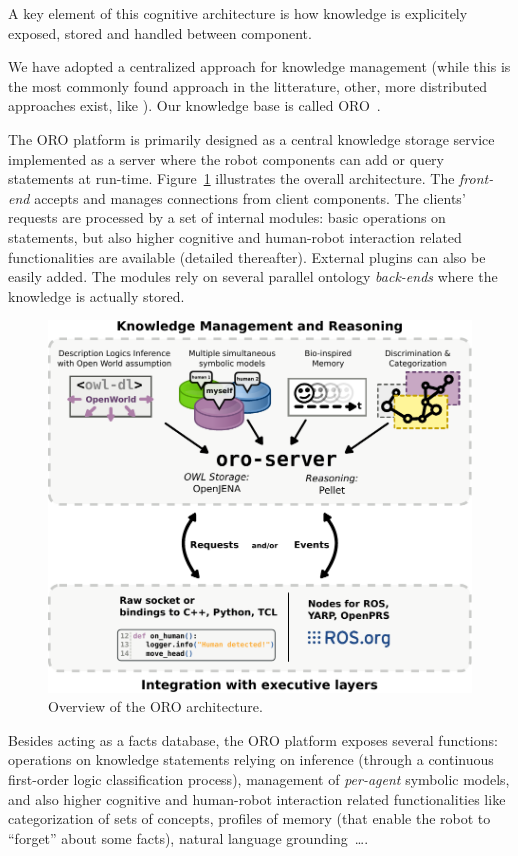 \documentclass{svmult}
\begin{document}
A key element of this cognitive architecture is how knowledge is explicitely
exposed, stored and handled between component.

We have adopted a centralized approach for knowledge management (while this is
the most commonly found approach in the litterature, other, more distributed
approaches exist, like \cite{Jacobsson2008}). Our knowledge base is called
ORO~\cite{Lemaignan2010}.

The ORO platform is primarily designed as a central
knowledge storage service implemented as a server where the robot
components can add or query statements at run-time. Figure~\ref{fig|oro-overview}
illustrates the overall architecture. The \emph{front-end} accepts and manages
connections from client components. The clients' requests are processed by a
set of internal modules: basic operations on statements, but also higher
cognitive and human-robot interaction related functionalities are available
(detailed thereafter). External plugins can also be easily added. The modules
rely on several parallel ontology \emph{back-ends} where the knowledge is
actually stored.

\begin{figure}[!t]
\centering
  \includegraphics[width=0.8\linewidth]{figs/oro_architecture_functional.pdf}
  \caption{Overview of the ORO architecture.}
  \label{fig|oro-overview}
\end{figure}

Besides acting as a facts database, the ORO platform exposes several functions:
operations on knowledge statements relying on inference (through a continuous
first-order logic classification process), management of \emph{per-agent}
symbolic models, and also higher cognitive and human-robot interaction related
functionalities like categorization of sets of concepts, profiles of memory
(that enable the robot to ``forget'' about some facts), natural language
grounding~\cite{Lemaignan2011}\ldots.
\end{document}
